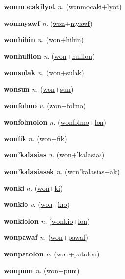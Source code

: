 \textbf{\hypertarget{wonmocakilyot}{wonmocakilyot}} \textit{n.} (\hyperlink{wonmocaki}{wonmocaki}+\allowbreak \hyperlink{lyot}{lyot})


\textbf{\hypertarget{wonmyawf}{wonmyawf}} \textit{n.} (\hyperlink{won}{won}+\allowbreak \hyperlink{myawf}{myawf})


\textbf{\hypertarget{wonhihin}{wonhihin}} \textit{n.} (\hyperlink{won}{won}+\allowbreak \hyperlink{hihin}{hihin})


\textbf{\hypertarget{wonhulilon}{wonhulilon}} \textit{n.} (\hyperlink{won}{won}+\allowbreak \hyperlink{hulilon}{hulilon})


\textbf{\hypertarget{wonsulak}{wonsulak}} \textit{n.} (\hyperlink{won}{won}+\allowbreak \hyperlink{sulak}{sulak})


\textbf{\hypertarget{wonsun}{wonsun}} \textit{n.} (\hyperlink{won}{won}+\allowbreak \hyperlink{sun}{sun})


\textbf{\hypertarget{wonfolmo}{wonfolmo}} \textit{v.} (\hyperlink{won}{won}+\allowbreak \hyperlink{folmo}{folmo})


\textbf{\hypertarget{wonfolmolon}{wonfolmolon}} \textit{n.} (\hyperlink{wonfolmo}{wonfolmo}+\allowbreak \hyperlink{lon}{lon})


\textbf{\hypertarget{wonfik}{wonfik}} \textit{n.} (\hyperlink{won}{won}+\allowbreak \hyperlink{fik}{fik})


\textbf{\hypertarget{won'kalasias}{won'kalasias}} \textit{n.} (\hyperlink{won}{won}+\allowbreak \hyperlink{'kalasias}{'kalasias})


\textbf{\hypertarget{won'kalasiasak}{won'kalasiasak}} \textit{n.} (\hyperlink{won'kalasias}{won'kalasias}+\allowbreak \hyperlink{ak}{ak})


\textbf{\hypertarget{wonki}{wonki}} \textit{n.} (\hyperlink{won}{won}+\allowbreak \hyperlink{ki}{ki})


\textbf{\hypertarget{wonkio}{wonkio}} \textit{v.} (\hyperlink{won}{won}+\allowbreak \hyperlink{kio}{kio})


\textbf{\hypertarget{wonkiolon}{wonkiolon}} \textit{n.} (\hyperlink{wonkio}{wonkio}+\allowbreak \hyperlink{lon}{lon})


\textbf{\hypertarget{wonpawaf}{wonpawaf}} \textit{n.} (\hyperlink{won}{won}+\allowbreak \hyperlink{pawaf}{pawaf})


\textbf{\hypertarget{wonpatolon}{wonpatolon}} \textit{n.} (\hyperlink{won}{won}+\allowbreak \hyperlink{patolon}{patolon})


\textbf{\hypertarget{wonpum}{wonpum}} \textit{n.} (\hyperlink{won}{won}+\allowbreak \hyperlink{pum}{pum})


